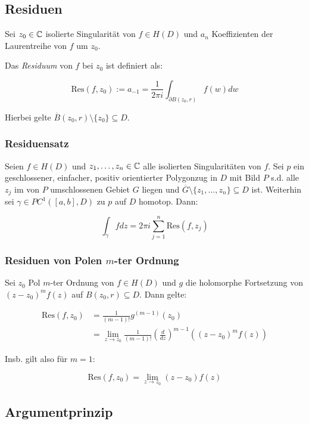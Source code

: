 \subsection*{Residuen}

Sei $z_0 \in \mathbb{C}$ isolierte Singularität von $f \in H(D)$ und $a_n$ Koeffizienten der Laurentreihe von $f$ um $z_0$.

Das \emph{Residuum} von $f$ bei $z_0$ ist definiert als:

$$\text{Res}(f,z_0) := a_{-1} = \frac{1}{2\pi i} \int_{\partial B(z_0,r)} f(w) dw$$

Hierbei gelte $\overline B(z_0,r) \setminus \{z_0\} \subseteq D$.

\subsubsection*{Residuensatz}

Seien $f \in H(D)$ und $z_1, \dots, z_n \in \mathbb{C}$ alle isolierten Singularitäten von $f$. Sei $p$ ein geschlossener, einfacher, positiv orientierter Polygonzug in $D$ mit Bild $P$ s.d. alle $z_j$ im von $P$ umschlossenen Gebiet $G$ liegen und $\overline G \setminus \{z_1,\dots,z_n\} \subseteq D$ ist. Weiterhin sei $\gamma \in PC^1([a,b],D)$ zu $p$ auf $D$ homotop. Dann:

\vspace*{-4mm}
$$\int_\gamma f dz = 2\pi i \sum_{j=1}^n \text{Res}(f,z_j)$$

\subsubsection*{Residuen von Polen $m$-ter Ordnung}

Sei $z_0$ Pol $m$-ter Ordnung von $f \in H(D)$ und $g$ die holomorphe Fortsetzung von $(z-z_0)^m f(z)$ auf $B(z_0,r) \subseteq D$. Dann gelte:

\vspace*{-4mm}
\begin{align*}
\text{Res}(f,z_0) &= \frac{1}{(m-1)!} g^{(m-1)}(z_0) \\
&= \lim_{z \to z_0} \frac{1}{(m-1)!}\left(\frac{d}{dz}\right)^{m-1} ((z-z_0)^m f(z))
\end{align*}

Insb. gilt also für $m=1$:

\vspace*{-2mm}
$$\text{Res}(f,z_0) = \lim_{z \to z_0}(z-z_0)f(z)$$

\subsection*{Argumentprinzip}

